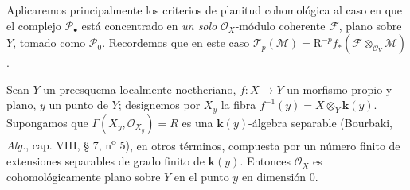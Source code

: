 Aplicaremos principalmente los criterios de planitud cohomológica al
caso en que el complejo $\mathscr P_\bullet$ está concentrado en \emph{un solo} $\mathscr O_X$-módulo coherente $\mathscr F$, plano
sobre $Y$, tomado como $\mathscr P_0$. Recordemos que en este caso
$\mathscr T_p(\mathscr M)=\mathrm R^{-p}f_*
(\mathscr F\otimes_{\mathscr O_Y}\mathscr M)$.

\begin{proposition}[7.8.6]
Sean $Y$ un preesquema localmente noetheriano, $f:X\to Y$ un morfismo propio
y plano, $y$ un punto de $Y$; designemos por $X_y$ la fibra
$f^{-1}(y)=X\otimes_Y\boldsymbol{k}(y)$. Supongamos que
$\Gamma(X_y,\mathscr O_{X_y})=R$ es una $\boldsymbol{k}(y)$-álgebra separable
\textup{(Bourbaki, \emph{Alg.}, cap. VIII, § 7, n\textsuperscript{o} 5)}, en otros términos,
compuesta por un número finito de extensiones separables de grado finito de $\boldsymbol{k}(y)$.
Entonces $\mathscr O_X$ es cohomológicamente plano sobre $Y$ en el punto $y$ en
dimensión 0.
\end{proposition}


